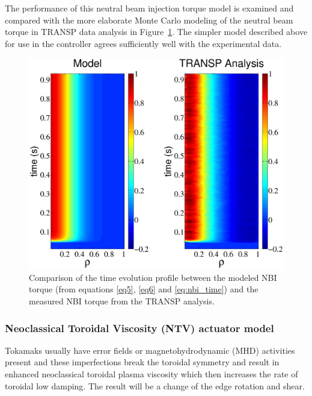 \documentclass[12pt]{iopart}
\begin{document}
The performance of this neutral beam injection torque model is examined and compared with the more elaborate Monte Carlo modeling of the neutral beam torque in TRANSP data analysis in Figure~\ref{fig:Fullnbi}. The simpler model described above for use in the controller agrees sufficiently well with the experimental data.
\begin{figure}
\centering
\includegraphics[width= \linewidth]{imene_figs/Goum9}%
\caption{Comparison of the time evolution profile between the modeled NBI torque (from equations \ref{eq5}, \ref{eq6} and \ref{eq:nbi_time}) and the measured NBI torque from the TRANSP analysis.}
\label{fig:Fullnbi}
\end{figure}



\subsubsection{Neoclassical Toroidal Viscosity (NTV) actuator model}
 \label{TNTV}

Tokamaks usually have error fields or magnetohydrodynamic (MHD) activities present and these imperfections break the toroidal symmetry and result in enhanced neoclassical toroidal plasma viscosity which then increases the rate of toroidal low damping. The result will be a change of the edge rotation and shear. 
\end{document}
